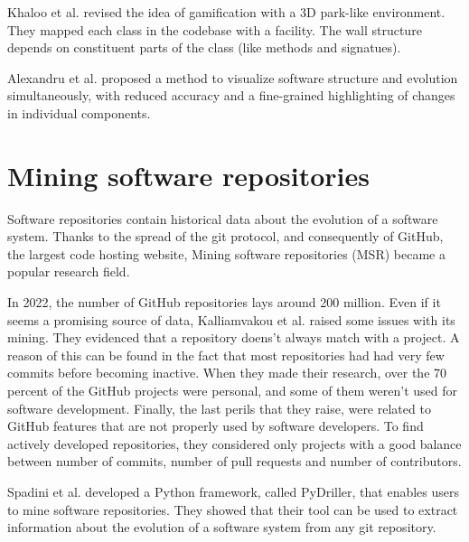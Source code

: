 Khaloo et al. \cite{Khaloo2017} revised the idea of gamification with a 3D park-like environment.
 They mapped each class in the codebase with a facility. The wall structure depends on constituent parts of the class (like methods and signatues). 

Alexandru et al. \cite{Alexandru2019} proposed a method to visualize software structure and evolution simultaneously, 
with reduced accuracy and a fine-grained highlighting of changes in individual components. 

\newpage

\section{Mining software repositories}

Software repositories contain historical data about the evolution of a software system. 
Thanks to the spread of the git protocol, and consequently of GitHub, the largest code hosting website, 
Mining software repositories (MSR) became a popular research field. 

In 2022, the number of GitHub repositories lays around 200 million.
Even if it seems a promising source of data, Kalliamvakou et al. \cite{Kalliamvakou2014} raised some issues with its mining.
They evidenced that a repository doens't always match with a project. 
A reason of this can be found in the fact that most repositories had had very few commits before becoming inactive.
When they made their research, over the 70 percent of the GitHub projects were personal, and some of them weren't used for software development. 
Finally, the last perils that they raise, were related to GitHub features that are not properly used by software developers.
To find actively developed repositories, they considered only projects with a good balance between number of commits, 
number of pull requests and number of contributors. 


Spadini et al. \cite{Spadini2018} developed a Python framework, called PyDriller, that enables users to mine software repositories. 
They showed that their tool can be used to extract information about the evolution of a software system from any git repository.  

\newpage

